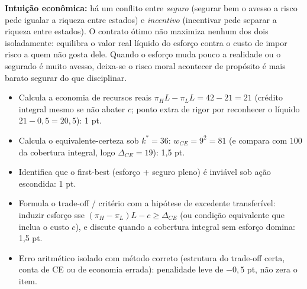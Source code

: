\begin{solucao}
\textbf{Intui\c{c}\~ao econ\^omica:} h\'a um conflito entre \emph{seguro} (segurar bem o avesso a risco pede igualar a riqueza entre estados) e \emph{incentivo} (incentivar pede separar a riqueza entre estados). O contrato \'otimo n\~ao maximiza nenhum dos dois isoladamente: equilibra o valor real l\'iquido do esfor\c{c}o contra o custo de impor risco a quem n\~ao gosta dele. Quando o esfor\c{c}o muda pouco a realidade ou o segurado \'e muito avesso, deixa-se o risco moral acontecer de prop\'osito \textemdash{} \'e mais barato segurar do que disciplinar.
\rubricalabel
\begin{itemize}
\item Calcula a economia de recursos reais $\pi_H L - \pi_L L = 42 - 21 = 21$ (cr\'edito integral mesmo se n\~ao abater $c$; ponto extra de rigor por reconhecer o l\'iquido $21 - 0{,}5 = 20{,}5$): 1 pt.
\item Calcula o equivalente-certeza sob $k^*=36$: $w_{CE} = 9^2 = 81$ (e compara com $100$ da cobertura integral, logo $\Delta_{CE}=19$): 1{,}5 pt.
\item Identifica que o first-best (esfor\c{c}o + seguro pleno) \'e invi\'avel sob a\c{c}\~ao escondida: 1 pt.
\item Formula o trade-off / crit\'erio com a hip\'otese de excedente transfer\'ivel: induzir esfor\c{c}o sse $(\pi_H-\pi_L)L - c \ge \Delta_{CE}$ (ou condi\c{c}\~ao equivalente que inclua o custo $c$), e discute quando a cobertura integral sem esfor\c{c}o domina: 1{,}5 pt.
\item Erro aritm\'etico isolado com m\'etodo correto (estrutura do trade-off certa, conta de CE ou de economia errada): penalidade leve de $-0{,}5$ pt, n\~ao zera o item.
\end{itemize}
\end{solucao}
